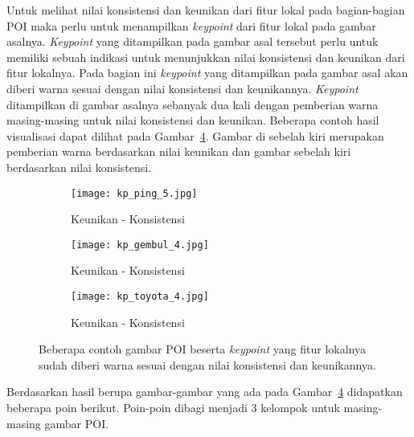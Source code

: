 Untuk melihat nilai konsistensi dan keunikan dari fitur lokal pada bagian-bagian POI maka perlu untuk menampilkan \textit{keypoint} dari fitur lokal pada gambar asalnya. \textit{Keypoint} yang ditampilkan pada gambar asal tersebut perlu untuk memiliki sebuah indikasi untuk menunjukkan nilai konsistensi dan keunikan dari fitur lokalnya. Pada bagian ini \textit{keypoint} yang ditampilkan pada gambar asal akan diberi warna sesuai dengan nilai konsistensi dan keunikannya.  \textit{Keypoint} ditampilkan di gambar asalnya sebanyak dua kali dengan pemberian warna masing-masing untuk nilai konsistensi dan keunikan. Beberapa contoh hasil visualisasi dapat dilihat pada Gambar~\ref{fig:contoh_visualisasi_clustering}. Gambar di sebelah kiri merupakan pemberian warna berdasarkan nilai keunikan dan gambar sebelah kiri berdasarkan nilai konsistensi.
\begin{figure}[H]
	\centering
	\begin{subfigure}{\textwidth}
		\texttt{[image: kp\_ping\_5.jpg]}
		\caption{Keunikan - Konsistensi}
		\label{fig:contoh_visualisasi_clustering_1}
	\end{subfigure}
	\begin{subfigure}{\textwidth}
		\texttt{[image: kp\_gembul\_4.jpg]}
		\caption{Keunikan - Konsistensi}
		\label{fig:contoh_visualisasi_clustering_2}
	\end{subfigure}
	\begin{subfigure}{\textwidth}
		\texttt{[image: kp\_toyota\_4.jpg]}
		\caption{Keunikan - Konsistensi}
		\label{fig:contoh_visualisasi_clustering_3}
	\end{subfigure}
	\caption{Beberapa contoh gambar POI beserta \textit{keypoint} yang fitur lokalnya sudah diberi warna sesuai dengan nilai konsistensi dan keunikannya.}
	\label{fig:contoh_visualisasi_clustering}
\end{figure}

Berdasarkan hasil berupa gambar-gambar yang ada pada Gambar~\ref{fig:contoh_visualisasi_clustering} didapatkan beberapa poin berikut. Poin-poin dibagi menjadi 3 kelompok untuk masing-masing gambar POI. 
